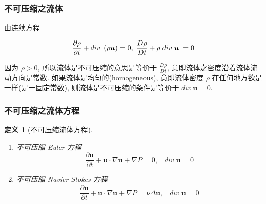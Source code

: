 \documentclass[aspectratio=2516]{beamer}
\newtheorem{defi}{\kaishu 定义}
\begin{document}

\begin{frame}
\frametitle{\kaishu 不可压缩之流体}

\kaishu 


\vspace{-0.15cm}

由连续方程

\vspace{0.15cm}

\begin{equation}
\frac{{\partial \rho }}{{\partial t}} + div\;\left( {\rho \boldsymbol{u}} \right) = 0,\;\frac{{D\rho }}{{Dt}} + \rho \;div\;\boldsymbol{u}\; = 0
\notag 
\end{equation}

因为 $ \rho > 0 $, 所以流体是不可压缩的意思是等价于 $\frac{{D\rho }}{{Dt}}$, 意即流体之密度沿着流体流动方向是常数. 如果流体是均匀的(homogeneous), 意即流体密度 $ \rho  $ 在任何地方欲是一样(是一固定常数), 则流体是不可压缩的条件是等价于 $ div \ \boldsymbol{u} = 0 $.

\end{frame}



\begin{frame}
\frametitle{\kaishu 不可压缩之流体方程}

\kaishu 
 
\begin{defi}[\kaishu 不可压缩流体方程]
	\begin{enumerate}
		\kaishu 
		\item 不可压缩 Euler 方程
		\begin{equation}
		\frac{{\partial \boldsymbol{u}}}{{\partial t}} + \boldsymbol{u} \cdot \nabla \boldsymbol{u} + \nabla P = 0,\;\;\;div\;\boldsymbol{u} = 0
		\label{eq5.2.8}
		\end{equation}
		\item 不可压缩 Navier-Stokes 方程
		\begin{equation}
		\frac{{\partial \boldsymbol{u}}}{{\partial t}} + \boldsymbol{u} \cdot \nabla \boldsymbol{u} + \nabla P = \nu \Delta \boldsymbol{u},\;\;\;div\;\boldsymbol{u} = 0
		\label{eq5.2.9}
		\end{equation}
	\end{enumerate}
\end{defi}

\end{frame}
\end{document}
